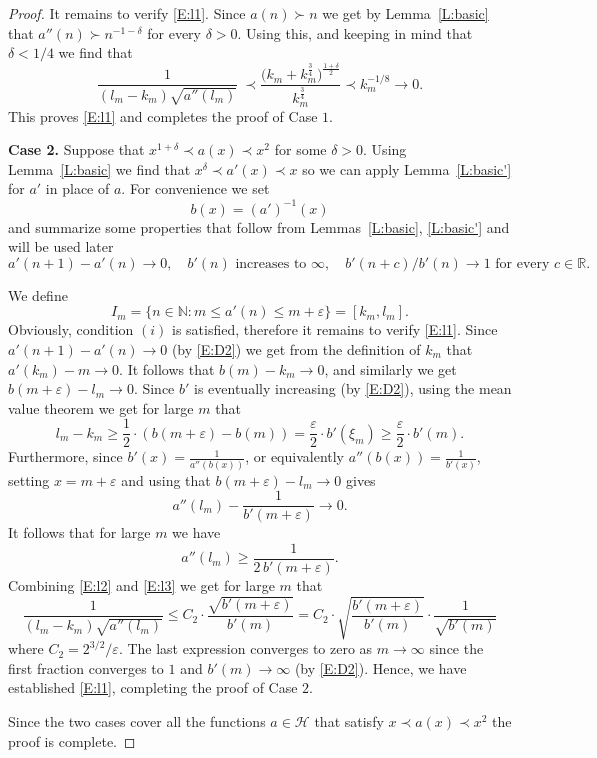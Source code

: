 \documentclass[11pt]{amsart}
\renewcommand{\H}{\mathcal{H}}
\newcommand{\R}{\mathbb{R}}
\newcommand{\N}{\mathbb{N}}
\theoremstyle{plain}
\theoremstyle{definition}
\theoremstyle{remark}
\begin{document}
\begin{proof}
It remains to verify \eqref{E:l1}. Since $a(n)\succ
n$ we get by Lemma~\ref{L:basic} that $a''(n) \succ n^{-1-\delta}$ for
every $\delta>0$. Using this, and keeping in mind that $\delta<1/4 $
we find that
$$
\frac{1}{(l_m-k_m)\sqrt{a''(l_m)}}\ \prec
\frac{({k_m+k_m^{\frac{3}{4}})^{\frac{1+\delta}{2}}}}{k_m^{\frac{3}{4}}}\prec
k_m^{-1/8}\to 0.
$$
This proves \eqref{E:l1} and completes the proof of Case $1$.


{\bf Case 2.} Suppose that $x^{1+\delta}\prec a(x)\prec x^2$ for some
$\delta>0$.  Using Lemma~\ref{L:basic} we find that $x^\delta \prec a'(x)\prec x$
so we can apply Lemma~\ref{L:basic'} for $a'$ in place of $a$.
For convenience we set
$$b(x)=(a')^{-1}(x)$$ and
summarize some properties that follow from Lemmas~\ref{L:basic},
\ref{L:basic'} and  will be used later
\begin{equation}\label{E:D2}
  a'(n+1)-a'(n)\to 0, \quad b'(n) \text{ increases to }  \infty ,\quad  b'(n+c)/b'(n)\to 1 \text{ for every } c\in\R.
\end{equation}

We define
$$
I_m=\{n\in\N\colon m\leq a'(n)\leq m+\varepsilon \}=[k_{m},l_{m}].
$$
Obviously, condition $(i)$ is satisfied, therefore
it remains to verify \eqref{E:l1}.
Since $a'(n+1)-a'(n)\to 0$ (by \eqref{E:D2}) we get from the definition of $k_m$ that
 $a'(k_m)-m\to 0$.
It follows that $b(m)- k_m\to 0$, and similarly we get
$b(m+\varepsilon)- l_m\to 0$. Since $b'$ is eventually increasing (by
\eqref{E:D2}), using the mean value theorem we get for large $m$ that
\begin{equation}\label{E:l2}
  l_m-k_m\geq \frac{1}{2}\cdot (b(m+\varepsilon)-b(m))= \frac{\varepsilon}{2}\cdot b'(\xi_m)\geq \frac{\varepsilon}{2}\cdot b'(m).
\end{equation}
Furthermore, since $b'(x) =\frac{1}{a''(b(x))}$, or equivalently $a''(b(x))=\frac{1}{b'(x)}$, setting
$x=m+\varepsilon$ and using that $b(m+\varepsilon)-l_m\to 0$ gives
$$
a''(l_m)- \frac{1}{b'(m+\varepsilon)}\to 0.
$$
It follows that for large $m$ we have
\begin{equation}\label{E:l3}
  a''(l_m)\geq \frac{1}{2 \, b'(m+\varepsilon)}.
\end{equation}
Combining \eqref{E:l2} and \eqref{E:l3} we get for large $m$ that
$$
\frac{1}{(l_m-k_m)\sqrt{a''(l_m)}}\leq C_2\cdot
\frac{\sqrt{b'(m+\varepsilon)}}{b'(m)}=C_2\cdot
\sqrt{\frac{{b'(m+\varepsilon)}}{b'(m)}}\cdot \frac{1}{\sqrt{b'(m)}}
$$
where $C_2=2^{3/2}/\varepsilon$. The last expression converges to zero
as $m\to\infty$ since the first fraction converges to $1$ and
$b'(m)\to \infty$ (by \eqref{E:D2}). Hence, we have established
\eqref{E:l1}, completing the proof of Case $2$.

Since the two cases cover all the functions $a\in \H$ that satisfy
$x\prec a(x)\prec x^2$ the proof is complete.
\end{proof}
\end{document}
